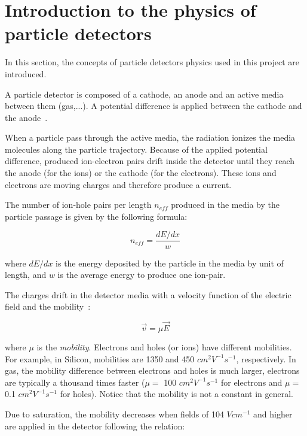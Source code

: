 \documentclass[11pt]{article}
\begin{document}
\section{Introduction to the physics of particle detectors}

	\label{equations}

	In this section, the concepts of particle detectors physics used in this project
	are introduced.

	A particle detector is composed of a cathode, an anode and an active media
	between them (gas,...). A potential difference is applied between the cathode
	and the anode~\cite{lphy2236}.

	When a particle pass through the active media, the radiation ionizes the media
	molecules along the particle trajectory.
	Because of the applied potential difference,
	produced ion-electron pairs drift inside the detector until they reach the anode
	(for the ions) or the cathode (for the electrons). These ions and electrons
	are moving charges and therefore produce a current.

	The number of ion-hole pairs per length $n_{eff}$ produced in the media by the
	particle passage is given by the following formula:

	\[n_{eff} = \frac{dE/dx}{w} \]

	where $dE/dx$ is the energy deposited by the particle in the media by
	unit of length, and $w$ is the average energy to produce one ion-pair.

	The charges drift in the detector media with a velocity function of the electric
	field and the mobility~\cite{spieler2005semiconductor}:

	\begin{equation}
		\vec{v} = \mu \vec{E}
		\label{eq:charge_speed}
	\end{equation}

	where $\mu$ is the \textit{mobility}. Electrons and holes (or ions) have different
	mobilities. For example, in Silicon, mobilities are 1350 and 450 $cm^2V^{-1}s^{-1}$,
	respectively. In gas, the mobility difference between electrons and holes is
	much larger, electrons are typically a thousand times faster \newline($\mu =$ 100 $cm^2V^{-1}s^{-1}$
	for electrons and $\mu =$ 0.1 $cm^2V^{-1}s^{-1}$ for holes). Notice that the mobility
	is not a constant in general.

	Due to saturation, the mobility decreases when fields of 104 $V cm^{-1}$ and higher are applied in
	the detector following the relation:
\end{document}
